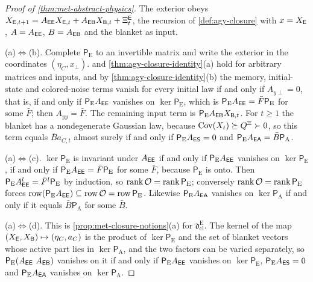 \begin{proof}[Proof of \cref{thm:met-abstract-physics}]
The exterior obeys $X_{\mathsf{E},t+1}=A_{\mathsf{E}\mathsf{E}}X_{\mathsf{E},t}+A_{\mathsf{E}\mathsf{B}}X_{\mathsf{B},t}+\Xi^{\mathsf{E}}_t$, the recursion of \cref{def:agy-closure} with $x=X_{\mathsf{E}}$, $A=A_{\mathsf{E}\mathsf{E}}$, $B=A_{\mathsf{E}\mathsf{B}}$ and the blanket as input.

(a)$\Leftrightarrow$(b). Complete $\mathsf P_{\mathrm E}$ to an invertible matrix and write the exterior in the coordinates $(\eta_C,x_\perp)$.  and \cref{thm:agy-closure-identity}(a) hold for arbitrary matrices and inputs, and by \cref{thm:agy-closure-identity}(b) the memory, initial-state and colored-noise terms vanish for every initial law if and only if $A_{y\perp}=0$, that is, if and only if $\mathsf P_{\mathrm E}A_{\mathsf{E}\mathsf{E}}$ vanishes on $\ker\mathsf P_{\mathrm E}$, which is $\mathsf P_{\mathrm E}A_{\mathsf{E}\mathsf{E}}=\bar F\mathsf P_{\mathrm E}$ for some $\bar F$; then $A_{yy}=\bar F$. The remaining input term is $\mathsf P_{\mathrm E}A_{\mathsf{E}\mathsf{B}}X_{\mathsf{B},t}$. For $t\ge1$ the blanket has a nondegenerate Gaussian law, because $\operatorname{Cov}(X_t)\succeq Q^{\Xi}\succ0$, so this term equals $\bar Ba_{C,t}$ almost surely if and only if $\mathsf P_{\mathrm E}A_{\mathsf{E}\mathsf{S}}=0$ and $\mathsf P_{\mathrm E}A_{\mathsf{E}\mathsf{A}}=\bar B\mathsf P_{\mathrm A}$.

(a)$\Leftrightarrow$(c). $\ker\mathsf P_{\mathrm E}$ is invariant under $A_{\mathsf{E}\mathsf{E}}$ if and only if $\mathsf P_{\mathrm E}A_{\mathsf{E}\mathsf{E}}$ vanishes on $\ker\mathsf P_{\mathrm E}$, if and only if $\mathsf P_{\mathrm E}A_{\mathsf{E}\mathsf{E}}=\bar F\mathsf P_{\mathrm E}$ for some $\bar F$, because $\mathsf P_{\mathrm E}$ is onto. Then $\mathsf P_{\mathrm E}A_{\mathsf{E}\mathsf{E}}^l=\bar F^l\mathsf P_{\mathrm E}$ by induction, so $\operatorname{rank}\mathcal O=\operatorname{rank}\mathsf P_{\mathrm E}$; conversely $\operatorname{rank}\mathcal O=\operatorname{rank}\mathsf P_{\mathrm E}$ forces $\operatorname{row}(\mathsf P_{\mathrm E}A_{\mathsf{E}\mathsf{E}})\subseteq\operatorname{row}\mathcal O=\operatorname{row}\mathsf P_{\mathrm E}$. Likewise $\mathsf P_{\mathrm E}A_{\mathsf{E}\mathsf{A}}$ vanishes on $\ker\mathsf P_{\mathrm A}$ if and only if it equals $\bar B\mathsf P_{\mathrm A}$ for some $\bar B$.

(a)$\Leftrightarrow$(d). This is \cref{prop:met-closure-notions}(a) for $\mathfrak d^{\mathrm E}_{\mathrm{cl}}$. The kernel of the map $(X_{\mathsf{E}},X_{\mathsf{B}})\mapsto(\eta_C,a_C)$ is the product of $\ker\mathsf P_{\mathrm E}$ and the set of blanket vectors whose active part lies in $\ker\mathsf P_{\mathrm A}$, and the two factors can be varied separately, so $\mathsf P_{\mathrm E}(A_{\sE\sE}\ A_{\sE\sB})$ vanishes on it if and only if $\mathsf P_{\mathrm E}A_{\mathsf{E}\mathsf{E}}$ vanishes on $\ker\mathsf P_{\mathrm E}$, $\mathsf P_{\mathrm E}A_{\mathsf{E}\mathsf{S}}=0$ and $\mathsf P_{\mathrm E}A_{\mathsf{E}\mathsf{A}}$ vanishes on $\ker\mathsf P_{\mathrm A}$.


\end{proof}
